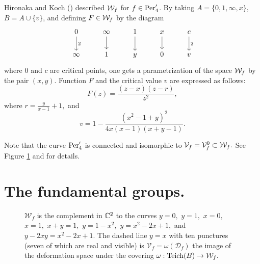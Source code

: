 \documentclass{article}
\begin{document}
Hironaka and Koch (\cite{HK}) described $\mathcal{W}_f$ for $f\in \operatorname{Per}'_4$. By taking $A=\{0, 1, \infty, x\},$ $B=A\cup\{v\}$, and defining $F\in \mathcal{W}_f$ by the diagram
\[
\begin{tikzcd}
0 \arrow[d,"2"] & \infty \arrow[d] & 1 \arrow[d] & x \arrow[d] & c \arrow[d,"2"] \\
\infty & 1      & y & 0 & v
\end{tikzcd}
\]
where $0$ and $c$ are critical points, one gets a parametrization of the space $\mathcal{W}_f$ by the pair $(x,y).$ Function $F$ and the critical value $v$ are expressed as follows:
$$
F(z)=\frac{(z-x)(z-r)}{z^2},
$$
where $r=\frac{y}{x-1}+1,$ and
$$
v=1-\frac{(x^2-1+y)^2}{4x(x-1)(x+y-1)}.
$$

Note that the curve $\operatorname{Per}'_4$ is connected and isomorphic to $\mathcal{V}_f=\mathcal{V}_f^0\subset\mathcal{W}_f.$ See Figure \ref{fig: W_f} and \cite{HK} for details.

\section{The fundamental groups.}

\begin{figure}
\begin{center}
\end{center}
\caption{$\mathcal{W}_f$ is the complement in $\mathbb{C}^2$ to the curves $y=0,$ $y=1,$ $x=0,$ $x=1,$ $x+y=1,$ $y=1-x^2,$ $y=x^2-2x+1,$ and $y-2xy=x^2-2x+1.$ The dashed line $y=x$ with ten punctures (seven of which are real and visible) is $\mathcal{V}_f=\omega(\mathcal{D}_f)$ the image of the deformation space under the covering $\omega:\operatorname{Teich}(B)\to\mathcal{W}_f.$}\label{fig: W_f}
\end{figure}
\end{document}
